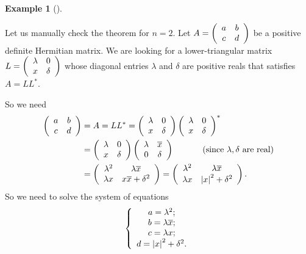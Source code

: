 \documentclass[numbers=enddot,12pt,final,onecolumn,notitlepage]{scrartcl}%
\numberwithin{exer}{subsection}
\theoremstyle{definition}
\newtheorem{exam}[theo]{Example}
\newenvironment{example}[1][]
{\begin{exam}[#1]\begin{leftbar}}
{\end{leftbar}\end{exam}}
\begin{document}
\begin{example}
Let us manually check the theorem for $n=2$. Let $A=\left(
\begin{array}
[c]{cc}%
a & b\\
c & d
\end{array}
\right)  $ be a positive definite Hermitian matrix. We are looking for a
lower-triangular matrix $L=\left(
\begin{array}
[c]{cc}%
\lambda & 0\\
x & \delta
\end{array}
\right)  $ whose diagonal entries $\lambda$ and $\delta$ are positive reals
that satisfies $A=LL^{\ast}$.

So we need%
\begin{align*}
\left(
\begin{array}
[c]{cc}%
a & b\\
c & d
\end{array}
\right)    & =A=LL^{\ast}=\left(
\begin{array}
[c]{cc}%
\lambda & 0\\
x & \delta
\end{array}
\right)  \left(
\begin{array}
[c]{cc}%
\lambda & 0\\
x & \delta
\end{array}
\right)  ^{\ast}\\
& =\left(
\begin{array}
[c]{cc}%
\lambda & 0\\
x & \delta
\end{array}
\right)  \left(
\begin{array}
[c]{cc}%
\lambda & \overline{x}\\
0 & \delta
\end{array}
\right)  \ \ \ \ \ \ \ \ \ \ \left(  \text{since }\lambda,\delta\text{ are
real}\right)  \\
& =\left(
\begin{array}
[c]{cc}%
\lambda^{2} & \lambda\overline{x}\\
\lambda x & x\overline{x}+\delta^{2}%
\end{array}
\right)  =\left(
\begin{array}
[c]{cc}%
\lambda^{2} & \lambda\overline{x}\\
\lambda x & \left\vert x\right\vert ^{2}+\delta^{2}%
\end{array}
\right)  .
\end{align*}
So we need to solve the system of equations%
\[
\left\{
\begin{array}
[c]{c}%
a=\lambda^{2};\\
b=\lambda\overline{x};\\
c=\lambda x;\\
d=\left\vert x\right\vert ^{2}+\delta^{2}.
\end{array}
\right.
\]



\end{example}
\end{document}

